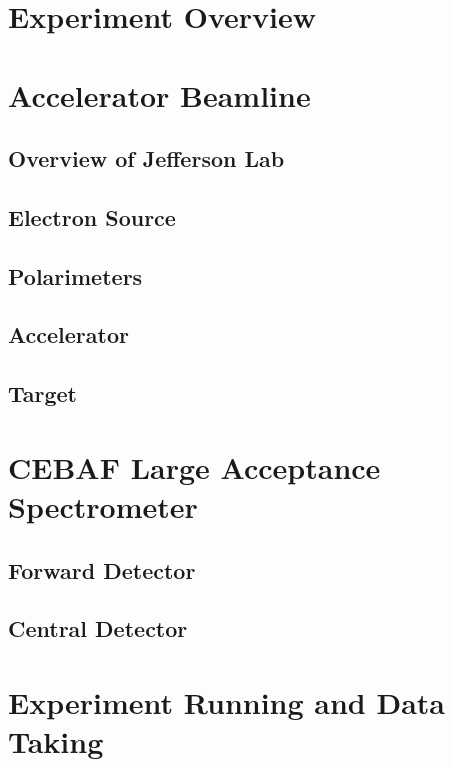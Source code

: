 \section{Experiment Overview}\label{ch2:sec1:overview}

\section{Accelerator Beamline}
    \subsection{Overview of Jefferson Lab}
    \subsection{Electron Source}
    \subsection{Polarimeters}
    \subsection{Accelerator}
    \subsection{Target}

\section{CEBAF Large Acceptance Spectrometer}
    \subsection{Forward Detector}
    \subsection{Central Detector}

\section{Experiment Running and Data Taking}
